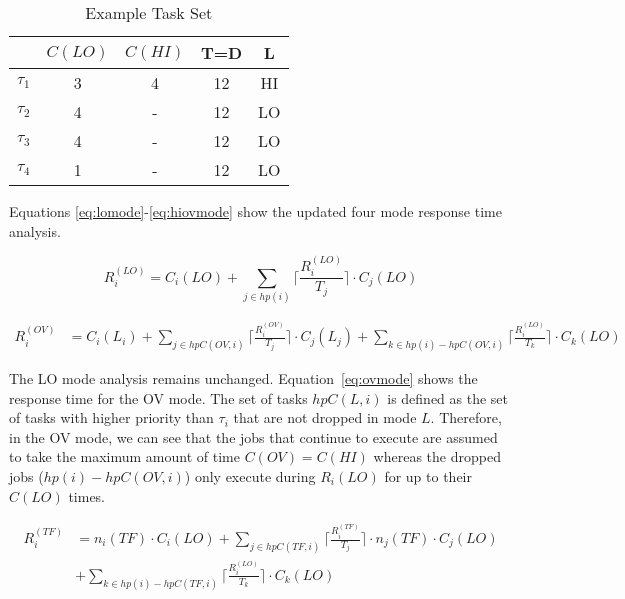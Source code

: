 	\begin{table}[h]
\caption{Example Task Set}
\centering

	\begin{tabular}{@{}lcccc@{}}
	\toprule
	& $C(LO)$ & $C(HI)$ & T=D & L 	 \\
	\bottomrule
	$\tau_1$ & 3 & 4 & 12 & HI  \\
	$\tau_2$ & 4 & - & 12 & LO  \\
	$\tau_3$ & 4 & - & 12 & LO  \\
	$\tau_4$ & 1 & - & 12 & LO  \\
	\end{tabular}

\label{t:example}
\end{table}
	
	Equations \ref{eq:lomode}-\ref{eq:hiovmode} show the updated four mode response time analysis.
	
	
\begin{equation}
R_i^{(LO)}= C_i(LO)+\sum_{j \in hp(i)}\Big\lceil\frac{R_i^{(LO)}}{T_j}\Big\rceil \cdot C_j(LO)
\label{eq:lomode}
\end{equation}

\begin{equation}\label{eq:ovmode}
\begin{aligned}
R_i^{(OV)} &  = C_i(L_i)+\sum_{j \in hpC(OV,i)}\Big\lceil\frac{R_i^{(OV)}}{T_j}\Big\rceil \cdot C_j(L_j) 
 +\sum_{k \in hp(i)-hpC(OV,i)}\Big\lceil\frac{R_i^{(LO)}}{T_k}\Big\rceil \cdot C_k(LO)
\end{aligned}
\end{equation}
	
	
	The LO mode analysis remains unchanged. Equation~\ref{eq:ovmode} shows the response time for the OV mode. 
	The set of tasks $hpC(L,i)$ is defined as the set of tasks with higher priority than $\tau_i$ that are not dropped in mode $L$. 
	Therefore, in the OV mode, we can see that the jobs that continue to execute are assumed to take the maximum amount of time $C(OV)=C(HI)$ whereas the dropped jobs ($hp(i) - hpC(OV,i)$) only execute during $R_i(LO)$ for up to their $C(LO)$ times.
	
\begin{equation}\label{eq:tfmode}
\begin{aligned}
R_i^{(TF)} & = n_i(TF) \cdot C_i(LO)
+\sum_{j \in hpC(TF,i)}\Big\lceil\frac{R_i^{(TF)}}{T_j}\Big\rceil \cdot n_j(TF) \cdot C_j(LO) \\
&  +\sum_{k \in hp(i)-hpC(TF,i)}\Big\lceil\frac{R_i^{(LO)}}{T_k}\Big\rceil \cdot C_k(LO)
\end{aligned}
\end{equation}

